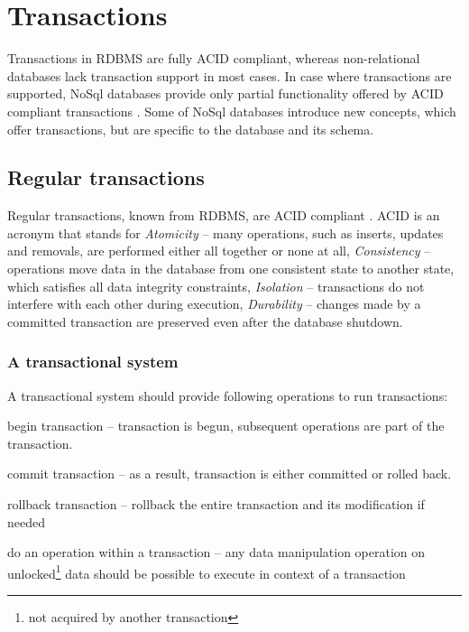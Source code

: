 \section{Transactions}\label{sec:theory:transactions}
Transactions in RDBMS are fully ACID compliant, whereas non-relational databases lack transaction support in most cases. 
In case where transactions are supported, NoSql databases provide only partial functionality offered by ACID compliant transactions \cite{StonebrakerSqlVsNosql}. 
Some of NoSql databases introduce new concepts, which offer transactions, but are specific to the database and its schema.


\subsection{Regular transactions}
Regular transactions, known from RDBMS, are ACID compliant \cite{ACID}. ACID is an acronym that stands for \emph{Atomicity} -- many operations, such as inserts, updates and removals, are performed either all together or none at all, \emph{Consistency} -- operations move data in the database from one consistent state to another state, which satisfies all data integrity constraints, \emph{Isolation} -- transactions do not interfere with each other during execution, \emph{Durability} -- changes made by a committed transaction are preserved even after the database shutdown.

\subsubsection{A transactional system}
A transactional system should provide following operations to run transactions:
\begin{enumerate*}
\item begin transaction -- transaction is begun, subsequent operations are part of the transaction. 
\item commit transaction -- as a result, transaction is either committed or rolled back.
\item rollback transaction -- rollback the entire transaction and its modification if needed
\item do an operation within a transaction -- any data manipulation operation on unlocked\footnote{not acquired by another transaction} data should be possible to execute in context of a transaction
\end{enumerate*}


